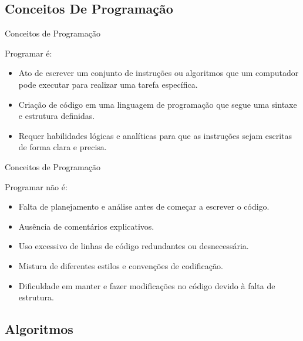 \documentclass{beamer}
\begin{document}
\subsection{Conceitos De Programação}

\begin{frame}{Conceitos de Programação}

Programar é:

\begin{itemize}
	\item Ato de escrever um conjunto de instruções ou algoritmos que um computador pode executar para realizar uma tarefa específica.
	\item Criação de código em uma linguagem de programação que segue uma sintaxe e estrutura definidas.
	\item Requer habilidades lógicas e analíticas para que as instruções sejam escritas de forma clara e precisa.
\end{itemize}

\end{frame}

\begin{frame}{Conceitos de Programação}
	
	Programar não é:
	
	\begin{itemize}
		\item Falta de planejamento e análise antes de começar a escrever o código.
		\item Ausência de comentários explicativos.
		\item Uso excessivo de linhas de código redundantes ou desnecessária.
		\item Mistura de diferentes estilos e convenções de codificação.
		\item Dificuldade em manter e fazer modificações no código devido à falta de estrutura.
	\end{itemize}
	
\end{frame}

\subsection{Algoritmos}
\end{document}
